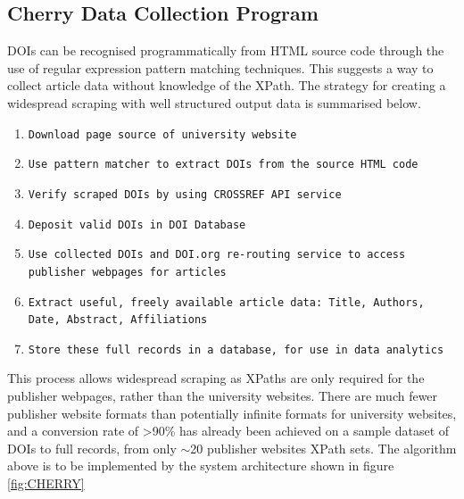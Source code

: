 \documentclass[11pt, oneside]{article}   	%
\begin{document}
\subsection{Cherry Data Collection Program}
\label{sec:CHERRY}
DOIs can be recognised programmatically from HTML source code through the use of regular expression pattern matching techniques. This suggests a way to collect article data without knowledge of the XPath. 
The strategy for creating a widespread scraping with well structured output data is summarised below.
\begin{sloppypar}
\begin{enumerate}
\item \texttt{Download page source of university website}
\item \texttt{Use pattern matcher to extract DOIs from the source HTML code}
\item \texttt{Verify scraped DOIs by using CROSSREF API service}
\item \texttt{Deposit valid DOIs in DOI Database}
\item \texttt{Use collected DOIs and DOI.org re-routing service  to access publisher webpages for articles}
\item \texttt{Extract useful, freely available article data: Title, Authors, Date, Abstract, Affiliations}
\item \texttt{Store these full records in a database, for use in data analytics}
\end{enumerate}
\end{sloppypar}
This process allows widespread scraping as XPaths are only required for the publisher webpages, rather than the university websites. There are much fewer publisher website formats than potentially infinite formats for university websites, and a conversion rate of \textgreater 90\% has already been achieved on a sample dataset of DOIs to full records, from only $\sim$20 publisher websites XPath sets. 
The algorithm above is to be implemented by the system architecture shown in figure \ref{fig:CHERRY}
\end{document}
